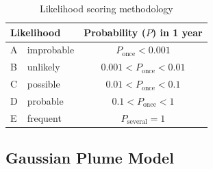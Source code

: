 \begin{table}[H]
\centering
\caption{Likelihood scoring methodology}
\label{tab:likelihood-methodology}
\begin{tabular}{@{}llc@{}}
\toprule
\multicolumn{2}{l}{Likelihood} & Probability ($P$) in 1 year              \\ \midrule
A & improbable & $         P_\mathrm{once} < 0.001 $ \\
B & unlikely   & $ 0.001 < P_\mathrm{once} < 0.01  $ \\
C & possible   & $ 0.01  < P_\mathrm{once} < 0.1   $ \\
D & probable   & $ 0.1   < P_\mathrm{once} < 1     $ \\
E & frequent   & $         P_\mathrm{several} = 1  $ \\ \bottomrule
\end{tabular}
\end{table}

\subsection{Gaussian Plume Model}
\label{app:plumemodel}

